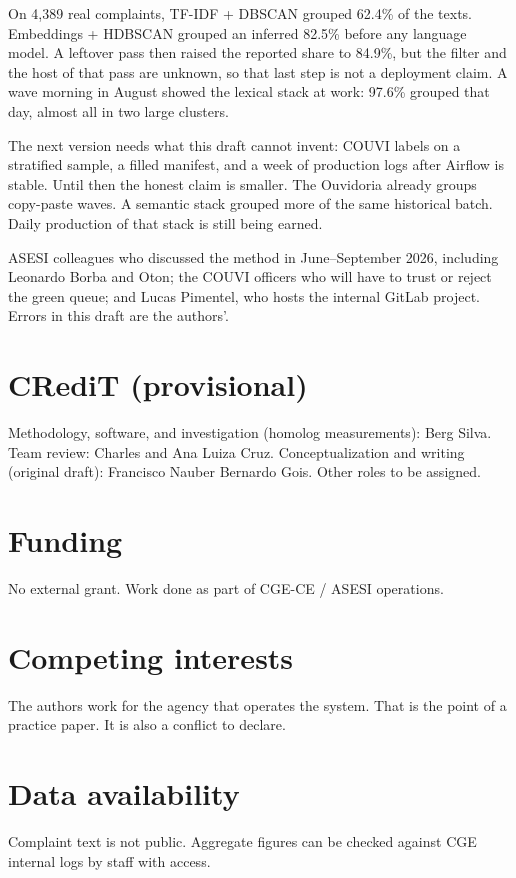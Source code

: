 \documentclass[acmlarge,screen]{acmart}
\begin{document}
On 4{,}389 real complaints, TF-IDF + DBSCAN grouped 62.4\% of the texts. Embeddings + HDBSCAN grouped an inferred 82.5\% before any language model. A leftover pass then raised the reported share to 84.9\%, but the filter and the host of that pass are unknown, so that last step is not a deployment claim. A wave morning in August showed the lexical stack at work: 97.6\% grouped that day, almost all in two large clusters.

The next version needs what this draft cannot invent: COUVI labels on a stratified sample, a filled manifest, and a week of production logs after Airflow is stable. Until then the honest claim is smaller. The Ouvidoria already groups copy-paste waves. A semantic stack grouped more of the same historical batch. Daily production of that stack is still being earned.

\begin{acks}
ASESI colleagues who discussed the method in June--September 2026, including Leonardo Borba and Oton; the COUVI officers who will have to trust or reject the green queue; and Lucas Pimentel, who hosts the internal GitLab project. Errors in this draft are the authors'.
\end{acks}

\section*{CRediT (provisional)}
Methodology, software, and investigation (homolog measurements): Berg Silva. Team review: Charles and Ana Luiza Cruz. Conceptualization and writing (original draft): Francisco Nauber Bernardo Gois. Other roles to be assigned.

\section*{Funding}
No external grant. Work done as part of CGE-CE / ASESI operations.

\section*{Competing interests}
The authors work for the agency that operates the system. That is the point of a practice paper. It is also a conflict to declare.

\section*{Data availability}
Complaint text is not public. Aggregate figures can be checked against CGE internal logs by staff with access.
\end{document}

